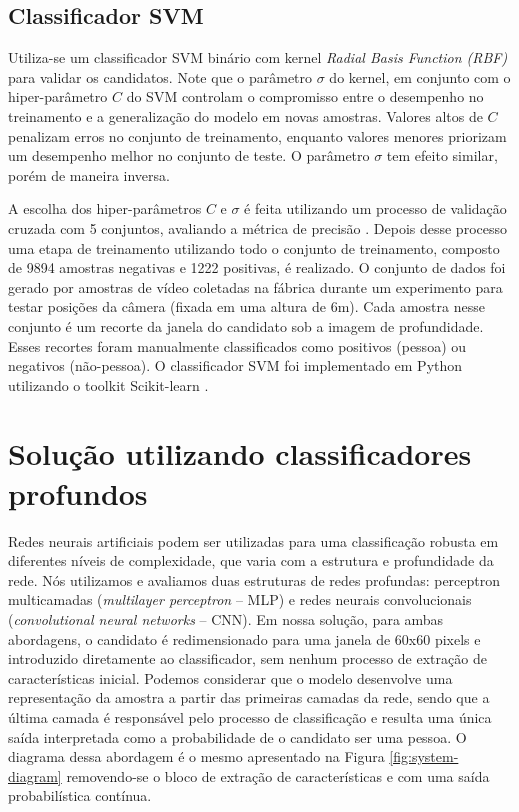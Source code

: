     \subsection{Classificador SVM}
      Utiliza-se um classificador SVM binário com kernel \textit{Radial Basis Function (RBF)} \cite{rbfkernel} para validar os candidatos. Note que o parâmetro $\sigma$ do kernel, em conjunto com o hiper-parâmetro $C$ do SVM controlam o compromisso entre o desempenho no treinamento e a generalização do modelo em novas amostras. Valores altos de $C$ penalizam erros no conjunto de treinamento, enquanto valores menores priorizam um desempenho melhor no conjunto de teste. O parâmetro $\sigma$ tem efeito similar, porém de maneira inversa.

      A escolha dos hiper-parâmetros $C$ e $\sigma$ é feita utilizando um processo de validação cruzada com 5 conjuntos, avaliando a métrica de precisão \cite{evaluationMetrics}. Depois desse processo uma etapa de treinamento utilizando todo o conjunto de treinamento, composto de 9894 amostras negativas e 1222 positivas, é realizado. O conjunto de dados foi gerado por amostras de vídeo coletadas na fábrica durante um experimento para testar posições da câmera (fixada em uma altura de 6m). Cada amostra nesse conjunto é um recorte da janela do candidato sob a imagem de profundidade. Esses recortes foram manualmente classificados como positivos (pessoa) ou negativos (não-pessoa). O classificador SVM foi implementado em Python utilizando o toolkit Scikit-learn \cite{scikit-learn}.


\section{Solução utilizando classificadores profundos}
\label{sec:deep}

    Redes neurais artificiais podem ser utilizadas para uma classificação robusta em diferentes níveis de complexidade, que varia com a estrutura e profundidade da rede. Nós utilizamos e avaliamos duas estruturas de redes profundas: perceptron multicamadas (\textit{multilayer perceptron} -- MLP) e redes neurais convolucionais (\textit{convolutional neural networks} -- CNN). Em nossa solução, para ambas abordagens, o candidato é redimensionado para uma janela de 60x60 pixels e introduzido diretamente ao classificador, sem nenhum processo de extração de características inicial. Podemos considerar que o modelo desenvolve uma representação da amostra a partir das primeiras camadas da rede, sendo que a última camada é responsável pelo processo de classificação e resulta uma única saída interpretada como a probabilidade de o candidato ser uma pessoa. O diagrama dessa abordagem é o mesmo apresentado na Figura \ref{fig:system-diagram} removendo-se o bloco de extração de características e com uma saída probabilística contínua.

